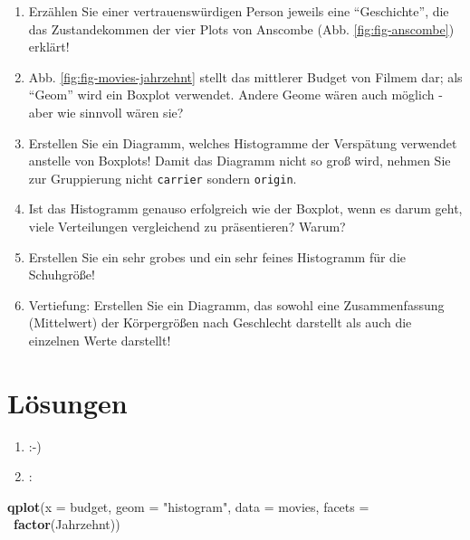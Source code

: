 \documentclass[12pt,ngerman,]{book}
\makeatletter
\newenvironment{Shaded}{\begin{snugshade}}{\end{snugshade}}
\newcommand{\KeywordTok}[1]{\textcolor[rgb]{0.13,0.29,0.53}{\textbf{{#1}}}}
\newcommand{\DataTypeTok}[1]{\textcolor[rgb]{0.13,0.29,0.53}{{#1}}}
\newcommand{\StringTok}[1]{\textcolor[rgb]{0.31,0.60,0.02}{{#1}}}
\newcommand{\NormalTok}[1]{{#1}}
\newenvironment{kframe}{%
\medskip{}
\setlength{\fboxsep}{.8em}
 \def\at@end@of@kframe{}%
 \ifinner\ifhmode%
  \def\at@end@of@kframe{\end{minipage}}%
  \begin{minipage}{\columnwidth}%
 \fi\fi%
 \def\FrameCommand##1{\hskip\@totalleftmargin \hskip-\fboxsep
 \colorbox{shadecolor}{##1}\hskip-\fboxsep
     \hskip-\linewidth \hskip-\@totalleftmargin \hskip\columnwidth}%
 \MakeFramed {\advance\hsize-\width
   \@totalleftmargin\z@ \linewidth\hsize
   \@setminipage}}%
 {\par\unskip\endMakeFramed%
 \at@end@of@kframe}
\renewenvironment{Shaded}{\begin{kframe}}{\end{kframe}}
\makeatother
\begin{document}
\begin{enumerate}
\def\labelenumi{\arabic{enumi}.}
\item
  Erzählen Sie einer vertrauenswürdigen Person jeweils eine
  ``Geschichte'', die das Zustandekommen der vier Plots von Anscombe
  (Abb. \ref{fig:fig-anscombe}) erklärt!
\item
  Abb. \ref{fig:fig-movies-jahrzehnt} stellt das mittlerer Budget von
  Filmem dar; als ``Geom'' wird ein Boxplot verwendet. Andere Geome
  wären auch möglich - aber wie sinnvoll wären sie?
\item
  Erstellen Sie ein Diagramm, welches Histogramme der Verspätung
  verwendet anstelle von Boxplots! Damit das Diagramm nicht so groß
  wird, nehmen Sie zur Gruppierung nicht \texttt{carrier} sondern
  \texttt{origin}.
\item
  Ist das Histogramm genauso erfolgreich wie der Boxplot, wenn es darum
  geht, viele Verteilungen vergleichend zu präsentieren? Warum?
\item
  Erstellen Sie ein sehr grobes und ein sehr feines Histogramm für die
  Schuhgröße!
\item
  Vertiefung: Erstellen Sie ein Diagramm, das sowohl eine
  Zusammenfassung (Mittelwert) der Körpergrößen nach Geschlecht
  darstellt als auch die einzelnen Werte darstellt!
\end{enumerate}

\section{Lösungen}\label{losungen}

\begin{enumerate}
\def\labelenumi{\arabic{enumi}.}
\item
  :-)
\item
  :
\end{enumerate}

\begin{Shaded}
\begin{Highlighting}[]
\KeywordTok{qplot}\NormalTok{(}\DataTypeTok{x =} \NormalTok{budget, }\DataTypeTok{geom =} \StringTok{"histogram"}\NormalTok{, }\DataTypeTok{data =} \NormalTok{movies, }\DataTypeTok{facets =} \NormalTok{~}\KeywordTok{factor}\NormalTok{(Jahrzehnt))}
\end{Highlighting}
\end{Shaded}
\end{document}

